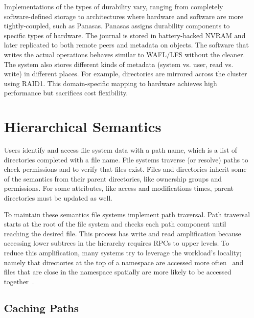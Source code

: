 Implementations of the types of durability vary, ranging from completely
software-defined storage to architectures where hardware and software are more
tightly-coupled, such as Panasas. Panasas assigns durability components to
specific types of hardware. The journal is stored in battery-backed NVRAM and
later replicated to both remote peers and metadata on objects. The software
that writes the actual operations behaves similar to WAFL/LFS without the
cleaner. The system also stores different kinds of metadata (system vs. user,
read vs. write) in different places. For example, directories are mirrored
across the cluster using RAID1. This domain-specific mapping to hardware
achieves high performance but sacrifices cost flexibility.

\section{Hierarchical Semantics}

Users identify and access file system data with a path name, which is a list of
directories completed with a file name.  File systems traverse (or resolve)
paths to check permissions and to verify that files exist. Files and
directories inherit some of the semantics from their parent directories, like
ownership groups and permissions. For some attributes, like access and
modifications times, parent directories must be updated as well. 

To maintain these semantics file systems implement path traversal. Path
traversal starts at the root of the file system and checks each path component
until reaching the desired file. This process has write and read amplification
because accessing lower subtrees in the hierarchy requires RPCs to upper
levels. To reduce this amplification, many systems try to leverage the
workload's locality; namely that directories at the top of a namespace are
accessed more often~\cite{ren:sc2014-indexfs} and files that are close in the
namespace spatially are more likely to be accessed
together~\cite{weil:osdi2006-ceph, weil:sc2004-dyn-metadata}.

\subsection{Caching Paths}

